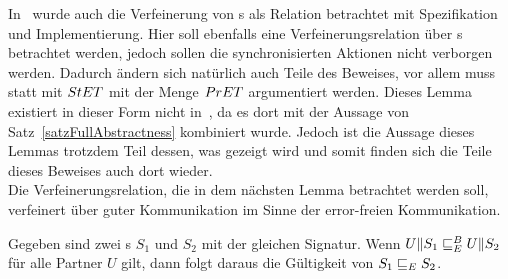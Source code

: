 In~\cite{Vogler2014EIO} wurde auch die Verfeinerung von \EIO{}s als Relation
betrachtet mit Spezifikation und Implementierung. Hier soll ebenfalls eine
Verfeinerungsrelation über \EIO{}s betrachtet werden, jedoch sollen die
synchronisierten Aktionen nicht verborgen werden. Dadurch ändern sich natürlich
auch Teile des Beweises, vor allem muss statt mit $StET{}$ mit der Menge
$PrET{}$ argumentiert werden. Dieses Lemma existiert in dieser Form nicht
in~\cite{Schlosser2012BA}, da es dort mit der Aussage von
Satz~\ref{satzFullAbstractness} kombiniert wurde. Jedoch ist die Aussage dieses
Lemmas trotzdem Teil dessen, was gezeigt wird und somit finden sich die Teile
dieses Beweises auch dort wieder.\\
Die Verfeinerungsrelation, die in dem nächsten Lemma betrachtet werden soll,
verfeinert über guter Kommunikation im Sinne der error-freien Kommunikation.

\begin{lem}
  \label{lemVerfeinerung}
  Gegeben sind zwei \EIO{}s $S_1$ und $S_2$ mit der gleichen Signatur. Wenn
  $U\|S_1 \sqsubseteq _E^B U\|S_2$ für alle Partner $U$ gilt, dann folgt daraus die
  Gültigkeit von $S_1\sqsubseteq _E S_2$.
\end{lem}

